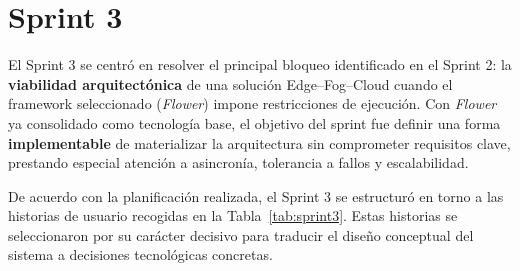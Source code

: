 \documentclass{report}
\begin{document}
\section{Sprint 3}
\label{sect:Sp3}
El Sprint 3 se centró en resolver el principal bloqueo identificado en el Sprint 2: la \textbf{viabilidad arquitectónica} de una solución Edge--Fog--Cloud cuando el framework seleccionado (\textit{Flower}) impone restricciones de ejecución. Con \textit{Flower} ya consolidado como tecnología base, el objetivo del sprint fue definir una forma \textbf{implementable} de materializar la arquitectura sin comprometer requisitos clave, prestando especial atención a asincronía, tolerancia a fallos y escalabilidad.

De acuerdo con la planificación realizada, el Sprint 3 se estructuró en torno a las historias de usuario recogidas en la Tabla~\ref{tab:sprint3}. Estas historias se seleccionaron por su carácter decisivo para traducir el diseño conceptual del sistema a decisiones tecnológicas concretas.
\end{document}
